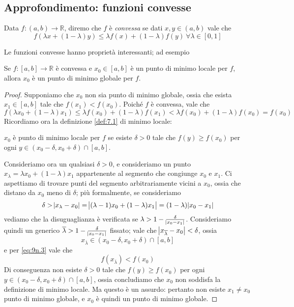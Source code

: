 \subsection{Approfondimento: funzioni convesse}
\begin{definition}
    \label{def:9n.1}
    Data $f\colon(a,b)\to \mathbb{R}$, diremo che $f$ è \emph{convessa} se dati $x,y\in(a,b)$ vale che
    \[
    f(\lambda x + (1-\lambda)y)\le \lambda f(x)+(1-\lambda)f(y) \ \forall \lambda\in[0,1]
    \]
\end{definition}
Le funzioni convesse hanno proprietà interessanti; ad esempio
\begin{theorem}
    \label{th:9n.2}
    Se $f\colon[a,b]\to\mathbb{R}$ è convessa e $x_0\in[a,b]$ è un punto di minimo locale per $f$, allora $x_0$ è un punto di minimo globale per $f$.
\end{theorem}
\begin{proof}
    Supponiamo che $x_0$ non sia punto di minimo globale, ossia che esista $x_1\in[a,b]$ tale che $f(x_1)<f(x_0)$. Poiché $f$ è convessa, vale che
    \begin{equation}
        \label{eq:9n.3}
        f(\lambda x_0 + (1-\lambda)x_1) \le \lambda f(x_0) + (1-\lambda) f(x_1) < \lambda f(x_0) +(1-\lambda) f(x_0) = f(x_0)
    \end{equation}
    Ricordiamo ora la definizione \ref{def:7.1} di minimo locale:
    \begin{tcolorbox}
        $x_0$ è punto di minimo locale per $f$ se esiste $\delta>0$ tale che $f(y)\ge f(x_0)$ per ogni $y\in (x_0-\delta, x_0 + \delta)\cap[a,b]$.
    \end{tcolorbox}
    Consideriamo ora un qualsiasi $\delta>0$, e consideriamo un punto $x_\lambda = \lambda x_0 + (1-\lambda)x_1$ appartenente al segmento che congiunge $x_0$ e $x_1$. Ci aspettiamo di trovare punti del segmento arbitrariamente vicini a $x_0$, ossia che distano da $x_0$ meno di $\delta$; più formalmente, se consideriamo
    \[
    \delta>\abs{x_\lambda - x_0} = \abs{(\lambda-1)x_0 + (1-\lambda)x_1} = (1-\lambda)\abs{x_0-x_1}
    \]
    vediamo che la disuguaglianza è verificata se $\lambda>1-\frac{\delta}{\abs{x_0-x_1}}$. Consideriamo quindi un generico $\overline{\lambda}>1-\frac{\delta}{\abs{x_0-x_1}}$ fissato; vale che $\abs{x_{\overline{\lambda}}-x_0}<\delta$, ossia
    \[
    x_{\overline{\lambda}}\in (x_0-\delta, x_0+\delta) \cap[a,b]
    \]
    e per \eqref{eq:9n.3} vale che
    \[
    f(x_{\overline{\lambda}})<f(x_0)
    \]
    Di conseguenza non esiste $\delta>0$ tale che $f(y)\ge f(x_0)$ per ogni $y\in (x_0-\delta, x_0+\delta)\cap[a,b]$, ossia concludiamo che $x_0$ non soddisfa la definizione di minimo locale. Ma questo è un assurdo: pertanto non esiste $x_1\ne x_0$ punto di minimo globale, e $x_0$ è quindi un punto di minimo globale.
\end{proof}
